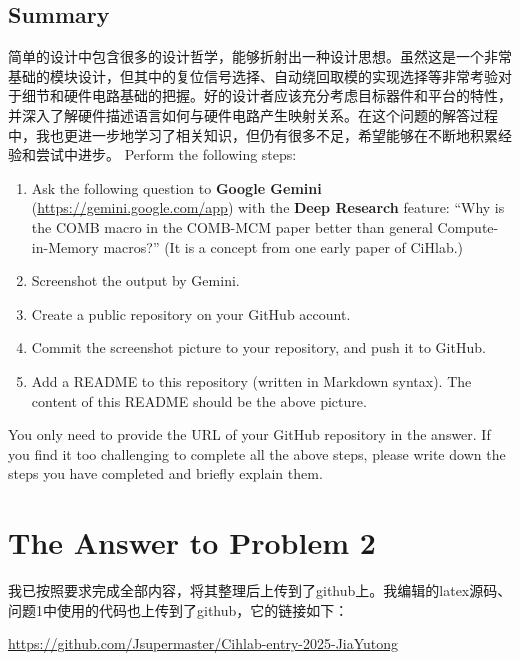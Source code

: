 \documentclass[11pt, a4 paper]{article}
\begin{document}
\subsection{Summary}
简单的设计中包含很多的设计哲学，能够折射出一种设计思想。虽然这是一个非常基础的模块设计，但其中的复位信号选择、自动绕回取模的实现选择等非常考验对于细节和硬件电路基础的把握。好的设计者应该充分考虑目标器件和平台的特性，并深入了解硬件描述语言如何与硬件电路产生映射关系。在这个问题的解答过程中，我也更进一步地学习了相关知识，但仍有很多不足，希望能够在不断地积累经验和尝试中进步。
\newpage
{}
Perform the following steps:
\begin{enumerate}[nosep]
    \item Ask the following question to \textbf{Google Gemini} (\url{https://gemini.google.com/app}) with the \textbf{Deep Research} feature: ``Why is the COMB macro in the COMB-MCM paper better than general Compute-in-Memory macros?'' (It is a concept from one early paper of CiHlab.)
    \item Screenshot the output by Gemini.
    \item Create a public repository on your GitHub account. 
    \item Commit the screenshot picture to your repository, and push it to GitHub.
    \item Add a README to this repository (written in Markdown syntax). The content of this README should be the above picture.
\end{enumerate}

You only need to provide the URL of your GitHub repository in the answer. 
If you find it too challenging to complete all the above steps, please write down the steps you have completed and briefly explain them.

\section{The Answer to Problem 2}
我已按照要求完成全部内容，将其整理后上传到了github上。我编辑的latex源码、问题1中使用的代码也上传到了github，它的链接如下：

\url{https://github.com/Jsupermaster/Cihlab-entry-2025-JiaYutong}
\vspace{1.4in}
\newpage
\end{document}
